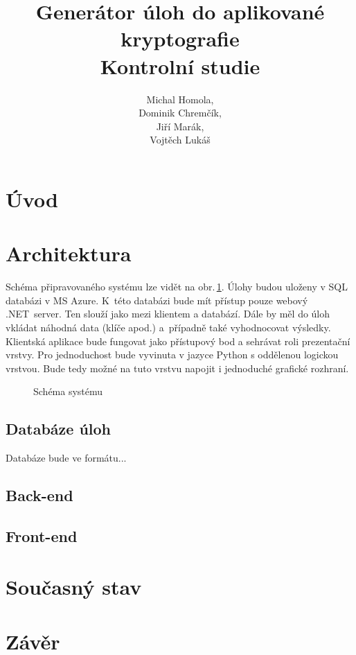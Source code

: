 \documentclass[titlepage]{article}
\title{Generátor úloh do aplikované kryptografie\\Kontrolní studie}
\author{Michal Homola,\\Dominik Chremčík,\\Jiří Marák,\\Vojtěch Lukáš}
\begin{document}
\maketitle

\tableofcontents

\section*{Úvod}

\section{Architektura}
Schéma připravovaného systému lze vidět na obr.\,\ref{fig:sys}. Úlohy budou uloženy v SQL databázi v MS Azure. K~této databázi bude mít přístup pouze webový .NET~server. Ten slouží jako  mezi klientem a databází. Dále by měl do úloh vkládat náhodná data (klíče apod.) a~případně také vyhodnocovat výsledky. 
Klientská aplikace bude fungovat jako přístupový bod a sehrávat roli prezentační vrstvy. Pro jednoduchost bude vyvinuta v jazyce Python s oddělenou logickou vrstvou. Bude tedy možné na tuto vrstvu napojit i jednoduché grafické rozhraní. 
\begin{figure}[h!]
    \centering
        
    \caption{Schéma systému}
    \label{fig:sys}
\end{figure}




\subsection{Databáze úloh}
Databáze bude ve formátu...

\subsection{Back-end}


\subsection{Front-end}

\section{Současný stav}

\section*{Závěr}
\end{document}

